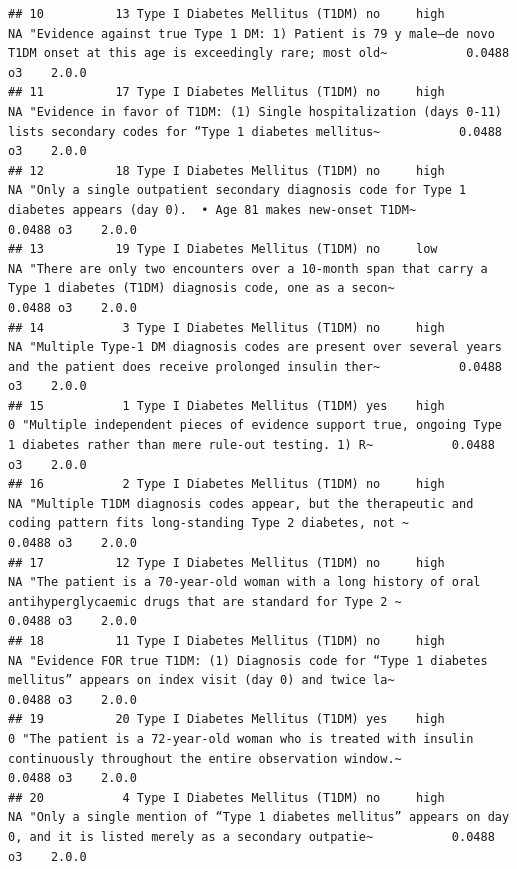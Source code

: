 \documentclass[
]{article}
\begin{document}
\begin{verbatim}
## 10          13 Type I Diabetes Mellitus (T1DM) no     high            NA "Evidence against true Type 1 DM: 1) Patient is 79 y male—de novo T1DM onset at this age is exceedingly rare; most old~           0.0488 o3    2.0.0        
## 11          17 Type I Diabetes Mellitus (T1DM) no     high            NA "Evidence in favor of T1DM: (1) Single hospitalization (days 0-11) lists secondary codes for “Type 1 diabetes mellitus~           0.0488 o3    2.0.0        
## 12          18 Type I Diabetes Mellitus (T1DM) no     high            NA "Only a single outpatient secondary diagnosis code for Type 1 diabetes appears (day 0).  • Age 81 makes new-onset T1DM~           0.0488 o3    2.0.0        
## 13          19 Type I Diabetes Mellitus (T1DM) no     low             NA "There are only two encounters over a 10-month span that carry a Type 1 diabetes (T1DM) diagnosis code, one as a secon~           0.0488 o3    2.0.0        
## 14           3 Type I Diabetes Mellitus (T1DM) no     high            NA "Multiple Type-1 DM diagnosis codes are present over several years and the patient does receive prolonged insulin ther~           0.0488 o3    2.0.0        
## 15           1 Type I Diabetes Mellitus (T1DM) yes    high             0 "Multiple independent pieces of evidence support true, ongoing Type 1 diabetes rather than mere rule-out testing. 1) R~           0.0488 o3    2.0.0        
## 16           2 Type I Diabetes Mellitus (T1DM) no     high            NA "Multiple T1DM diagnosis codes appear, but the therapeutic and coding pattern fits long-standing Type 2 diabetes, not ~           0.0488 o3    2.0.0        
## 17          12 Type I Diabetes Mellitus (T1DM) no     high            NA "The patient is a 70-year-old woman with a long history of oral antihyperglycaemic drugs that are standard for Type 2 ~           0.0488 o3    2.0.0        
## 18          11 Type I Diabetes Mellitus (T1DM) no     high            NA "Evidence FOR true T1DM: (1) Diagnosis code for “Type 1 diabetes mellitus” appears on index visit (day 0) and twice la~           0.0488 o3    2.0.0        
## 19          20 Type I Diabetes Mellitus (T1DM) yes    high             0 "The patient is a 72-year-old woman who is treated with insulin continuously throughout the entire observation window.~           0.0488 o3    2.0.0        
## 20           4 Type I Diabetes Mellitus (T1DM) no     high            NA "Only a single mention of “Type 1 diabetes mellitus” appears on day 0, and it is listed merely as a secondary outpatie~           0.0488 o3    2.0.0
\end{verbatim}
\end{document}
